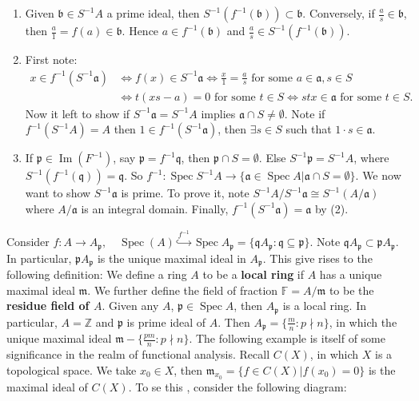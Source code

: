 \documentclass[12pt]{article}
\theoremstyle{definition}
\theoremstyle{plain}
\DeclareMathOperator{\im}{Im}
\DeclareMathOperator{\Spec}{Spec}
\newcommand{\z}{\mathbb{Z}}
\newcommand{\field}{\mathbb{F}}
\begin{document}
\begin{enumerate}
  \item Given $\mathfrak{b}\in S^{-1}A$ a prime ideal, then $S^{-1}(f^{-1}(\mathfrak{b}))\subset \mathfrak{b}$. Conversely, if $\frac{a}{s}\in \mathfrak{b}$, then $\frac{a}{1}=f(a)\in \mathfrak{b}$. Hence $a\in f^{-1}(\mathfrak{b})$ and $\frac{a}{s}\in S^{-1}(f^{-1}(\mathfrak{b}))$.
  \item First note:
  \begin{align*}
  x\in f^{-1}(S^{-1}\mathfrak{a}) &\iff f(x)\in S^{-1}\mathfrak{a}\iff \frac{x}{1}=\frac{a}{s}\text{ for some }a\in \mathfrak{a}, s\in S \\
    &\iff t(xs-a)=0 \text{ for some }t\in S \iff stx\in \mathfrak{a}\text{ for some }t\in S.
  \end{align*}
  Now it left to show if $S^{-1}\mathfrak{a}=S^{-1}A$ implies $\mathfrak{a}\cap S\neq \emptyset$. Note if $f^{-1}(S^{-1}A)=A$ then $1\in f^{-1}(S^{-1}\mathfrak{a})$, then $\exists s\in S$ such that $1\cdot s\in \mathfrak{a}$.
  \item If $\mathfrak{p}\in \im(F^{-1})$, say $\mathfrak{p}=f^{-1}\mathfrak{q}$, then $\mathfrak{p}\cap S=\emptyset$. Else $S^{-1}\mathfrak{p}=S^{-1}A$, where $S^{-1}(f^{-1}(\mathfrak{q}))=\mathfrak{q}$. So $f^{-1}:\Spec S^{-1}A\to \{\mathfrak{a}\in \Spec A|\mathfrak{a}\cap S=\emptyset\}$. We now want to show $S^{-1}\mathfrak{a}$ is prime. To prove it, note $S^{-1}A/S^{-1}\mathfrak{a}\cong S^{-1}(A/\mathfrak{a})$ where $A/\mathfrak{a}$ is an integral domain. Finally, $f^{-1}(S^{-1}\mathfrak{a})=\mathfrak{a}$ by (2).
\end{enumerate}
\Rmk Consider $f:A\to A_\mathfrak{p}, \quad \Spec(A)\overset{f^{-1}}{\hookrightarrow} \Spec A_\mathfrak{p}=\{\mathfrak{q}A_\mathfrak{p}:\mathfrak{q}\subseteq \mathfrak{p}\}$. Note $\mathfrak{q}A_\mathfrak{p}\subset \mathfrak{p}A_\mathfrak{p}$. In particular,  $\mathfrak{p}A_\mathfrak{p}$ is the unique maximal ideal in $A_\mathfrak{p}$. This give rises to the following definition:
\Def We define a ring $A$ to be a \textbf{local ring} if $A$ has a unique maximal ideal $\mathfrak{m}$. We further define the field of fraction $\field=A/\mathfrak{m}$ to be the \textbf{residue field of $A$}.
\Exe Given any $A$, $\mathfrak{p}\in \Spec A$, then $A_\mathfrak{p}$ is a local ring. In particular, $A=\z$ and $\mathfrak{p}$ is prime ideal of $A$. Then $A_\mathfrak{p}=\{\frac{m}{n}: p\nmid n\}$, in which the unique maximal ideal $\mathfrak{m}-\{\frac{pm}{n}: p\nmid n\}$.
\Exe The following example is itself of some significance in the realm of functional analysis. Recall $C(X)$, in which $X$ is a topological space. We take $x_0\in X$, then $\mathfrak{m}_{x_0}=\{f\in C(X)|f(x_0)=0\}$ is the maximal ideal of $C(X)$. To se this , consider the following diagram:
\end{document}
